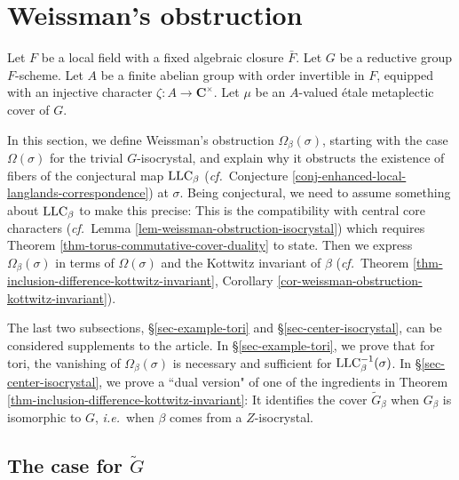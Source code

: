 \documentclass[10pt,english,reqno]{amsart}
\newcommand{\complexes}{\mathbf C}
\newcommand{\LLC}{\textnormal{LLC}}
\theoremstyle{definition}
\numberwithin{equation}{section}
\begin{document}


\medskip

%


\section{Weissman's obstruction}
\label{sec-weissman-obstruction}

Let $F$ be a local field with a fixed algebraic closure $\bar F$. Let $G$ be a reductive group $F$-scheme. Let $A$ be a finite abelian group with order invertible in $F$, equipped with an injective character $\zeta : A \rightarrow \complexes^{\times}$. Let $\mu$ be an $A$-valued \'etale metaplectic cover of $G$.

In this section, we define Weissman's obstruction $\Omega_{\beta}(\sigma)$, starting with the case $\Omega(\sigma)$ for the trivial $G$-isocrystal, and explain why it obstructs the existence of fibers of the conjectural map $\LLC_{\beta}$ (\emph{cf.}~Conjecture \ref{conj-enhanced-local-langlands-correspondence}) at $\sigma$. Being conjectural, we need to assume something about $\LLC_{\beta}$ to make this precise: This is the compatibility with central core characters (\emph{cf.}~Lemma \ref{lem-weissman-obstruction-isocrystal}) which requires Theorem \ref{thm-torus-commutative-cover-duality} to state. Then we express $\Omega_{\beta}(\sigma)$ in terms of $\Omega(\sigma)$ and the Kottwitz invariant of $\beta$ (\emph{cf.}~Theorem \ref{thm-inclusion-difference-kottwitz-invariant}, Corollary \ref{cor-weissman-obstruction-kottwitz-invariant}).

The last two subsections, \S\ref{sec-example-tori} and \S\ref{sec-center-isocrystal}, can be considered supplements to the article. In \S\ref{sec-example-tori}, we prove that for tori, the vanishing of $\Omega_{\beta}(\sigma)$ is necessary and sufficient for $\LLC_{\beta}^{-1}(\sigma)$. In  \S\ref{sec-center-isocrystal}, we prove a ``dual version" of one of the ingredients in Theorem \ref{thm-inclusion-difference-kottwitz-invariant}: It identifies the cover $\widetilde G_{\beta}$ when $G_{\beta}$ is isomorphic to $G$, \emph{i.e.}~when $\beta$ comes from a $Z$-isocrystal.

\subsection{The case for $\widetilde G$}
\end{document}
